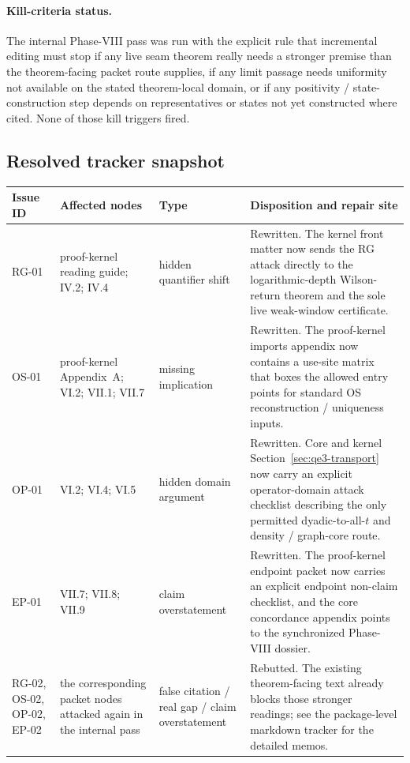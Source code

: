 \paragraph{Kill-criteria status.}
The internal Phase-VIII pass was run with the explicit rule that incremental editing must stop if any live seam theorem really needs a stronger premise than the theorem-facing packet route supplies, if any limit passage needs uniformity not available on the stated theorem-local domain, or if any positivity / state-construction step depends on representatives or states not yet constructed where cited. None of those kill triggers fired.

\subsection*{Resolved tracker snapshot}
\begingroup
\scriptsize
\setlength{\tabcolsep}{4pt}
\renewcommand{\arraystretch}{1.08}
\noindent\begin{tabular}{@{}p{}p{}p{}p{}@{}}
\toprule
\textbf{Issue ID} & \textbf{Affected nodes} & \textbf{Type} & \textbf{Disposition and repair site}\\
\midrule
RG-01 & proof-kernel reading guide; IV.2; IV.4 & hidden quantifier shift & Rewritten. The kernel front matter now sends the RG attack directly to the logarithmic-depth Wilson-return theorem and the sole live weak-window certificate.\\[0.35em]
OS-01 & proof-kernel Appendix~A; VI.2; VII.1; VII.7 & missing implication & Rewritten. The proof-kernel imports appendix now contains a use-site matrix that boxes the allowed entry points for standard OS reconstruction / uniqueness inputs.\\[0.35em]
OP-01 & VI.2; VI.4; VI.5 & hidden domain argument & Rewritten. Core and kernel Section~\ref{sec:qe3-transport} now carry an explicit operator-domain attack checklist describing the only permitted dyadic-to-all-$t$ and density / graph-core route.\\[0.35em]
EP-01 & VII.7; VII.8; VII.9 & claim overstatement & Rewritten. The proof-kernel endpoint packet now carries an explicit endpoint non-claim checklist, and the core concordance appendix points to the synchronized Phase-VIII dossier.\\[0.35em]
RG-02, OS-02, OP-02, EP-02 & the corresponding packet nodes attacked again in the internal pass & false citation / real gap / claim overstatement & Rebutted. The existing theorem-facing text already blocks those stronger readings; see the package-level markdown tracker for the detailed memos.\\
\bottomrule
\end{tabular}
\endgroup

